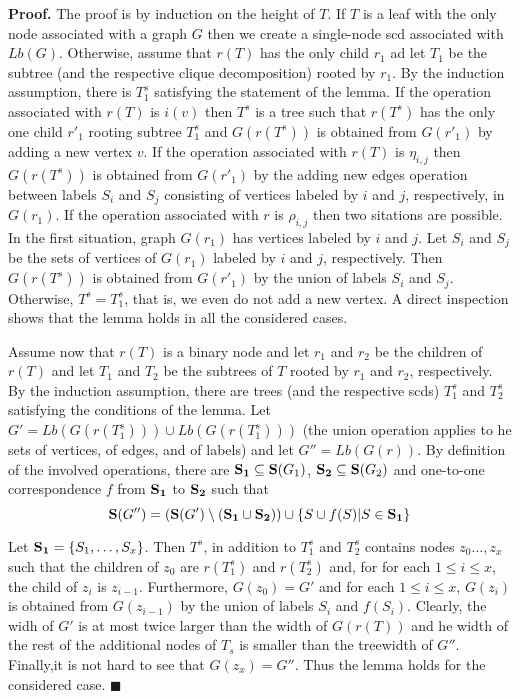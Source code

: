 \documentclass{llncs}
\begin{document}
{\bf Proof.}
The proof is by induction on the height of $T$. If $T$ is a leaf with the only
node associated with a graph $G$ then we create a single-node {\sc scd} 
associated with $Lb(G)$. Otherwise, assume that $r(T)$ has the only child
$r_1$ ad let $T_1$ be the subtree (and the respective clique decomposition)
rooted by $r_1$. By the induction assumption, there is $T^s_1$ satisfying
the statement of the lemma. If the operation associated with $r(T)$ is $i(v)$
then $T^s$ is a tree such that $r(T^s)$ has the only one child $r'_1$ rooting
subtree $T^s_1$ and $G(r(T^s))$ is obtained from $G(r'_1)$ by adding a new
vertex $v$. If the operation associated with $r(T)$ is $\eta_{i,j}$ then
$G(r(T^s))$ is obtained from $G(r'_1)$ by the adding new edges operation
between labels $S_i$ and $S_j$ consisting of vertices labeled by $i$ and $j$,
respectively, in $G(r_1)$. If the operation associated with $r$ is $\rho_{i,j}$
then two sitations are possible. In the first situation, graph $G(r_1)$ has 
vertices labeled by $i$ and $j$. Let $S_i$ and $S_j$ be the sets of vertices of
$G(r_1)$ labeled by $i$ and $j$, respectively. Then $G(r(T^s))$ is obtained from
$G(r'_1)$ by the union of labels $S_i$ and $S_j$. Otherwise, $T^s=T^s_1$, that is,
we even do not add a new vertex. A direct inspection shows that the lemma holds
in all the considered cases. 

Assume now that $r(T)$ is a binary node and let $r_1$ and $r_2$ be the children of
$r(T)$ and let $T_1$ and $T_2$ be the subtrees of $T$ rooted by $r_1$ and $r_2$,
respectively. By the induction assumption, there are trees (and the respective {\sc scd}s)
$T^s_1$ and $T^s_2$ satisfying the conditions of the lemma. Let 
$G'=Lb(G(r(T^s_1))) \cup Lb(G(r(T^s_1)))$ (the union operation applies to he sets of vertices,
of edges, and of labels) and let $G''=Lb(G(r))$. By definition of the involved operations,
there are ${\bf S_1} \subseteq {\bf S}(G_1)$, ${\bf S_2}\subseteq {\bf S}(G_2)$ and one-to-one
correspondence $f$ from ${\bf S_1}$ to ${\bf S_2}$ such that 
$${\bf S}(G'')=({\bf S}(G') \setminus ({\bf S_1} \cup {\bf S_2}))\cup \{S \cup f(S)|S \in {\bf S_1}\}$$

Let ${\bf S_1}=\{S_1, \dots, S_x\}$. Then $T^s$, in addition to $T^s_1$ and $T^s_2$ contains nodes
$z_0 \dots,z_x$ such that the children of $z_0$ are $r(T^s_1)$ and $r(T^s_2)$ and, for for each
$1 \leq i \leq x$, the child of $z_i$ is $z_{i-1}$. Furthermore, $G(z_0)=G'$ and for each 
$1 \leq i \leq x$, $G(z_i)$ is obtained from $G(z_{i-1})$ by the union of labels $S_i$ and $f(S_i)$.
Clearly, the widh of $G'$ is at most twice larger than the width of $G(r(T))$ and he width of the
rest of the additional nodes of $T_s$ is smaller than the treewidth of $G''$. Finally,it is not hard
to see that $G(z_x)=G''$. Thus the lemma holds for the considered case. $\blacksquare$
\end{document}
